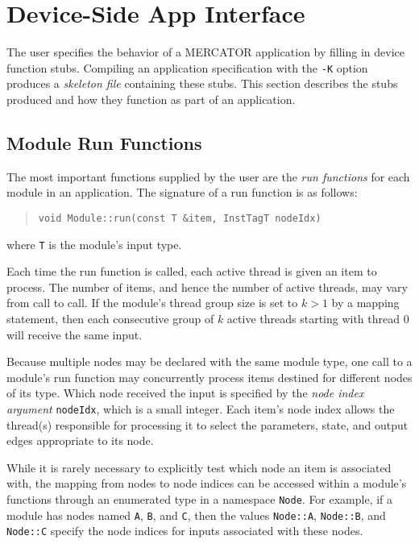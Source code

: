 \documentclass[11pt]{article}
\begin{document}
\section{Device-Side App Interface}

The user specifies the behavior of a MERCATOR application by filling
in device function stubs.  Compiling an application specification with
the \texttt{-K} option produces a \textit{skeleton file} containing
these stubs.  This section describes the stubs produced and how they
function as part of an application.

\subsection{Module Run Functions}

The most important functions supplied by the user are the \textit{run
  functions} for each module in an application.  The signature of a
run function is as follows:
\begin{quote}
\texttt{void Module::run(const T \&item, InstTagT nodeIdx)}
\end{quote}
where \texttt{T} is the module's input type.

Each time the run function is called, each active thread is given an
item to process.  The number of items, and hence the number of active
threads, may vary from call to call.  If the module's thread group
size is set to $k > 1$ by a mapping statement, then each consecutive
group of $k$ active threads starting with thread 0 will receive the
same input.

Because multiple nodes may be declared with the same module type, one
call to a module's run function may concurrently process items
destined for different nodes of its type.  Which node received the
input is specified by the \textit{node index argument}
\texttt{nodeIdx}, which is a small integer.  Each item's node index
allows the thread(s) responsible for processing it to select the
parameters, state, and output edges appropriate to its node.

While it is rarely necessary to explicitly test which node an item is
associated with, the mapping from nodes to node indices can be
accessed within a module's functions through an enumerated type in a
namespace \texttt{Node}.  For example, if a module has nodes named
\texttt{A}, \texttt{B}, and \texttt{C}, then the values
\texttt{Node::A}, \texttt{Node::B}, and \texttt{Node::C} specify the
node indices for inputs associated with these nodes.
\end{document}
